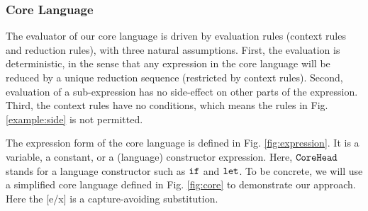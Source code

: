 \subsubsection{Core Language}


The evaluator of our core language is driven by evaluation rules (context rules and reduction rules), with three natural assumptions. First, the evaluation is deterministic, in the sense that any expression in the core language will be reduced by a unique reduction sequence (restricted by context rules). Second, evaluation of a sub-expression has no side-effect on other parts of the expression. Third, the context rules have no conditions, which means the rules in Fig. \ref{example:side} is not permitted.



The expression form of the core language is defined in Fig. \ref{fig:expression}. It is a variable, a constant, or a (language) constructor expression. Here, $\mbox{\tt CoreHead}$ stands for a language constructor such as $\mbox{\tt if}$ and $\mbox{\tt let}$. To be concrete, we will use a simplified core language defined in Fig.  \ref{fig:core} to demonstrate our approach. Here the [e/x] is a capture-avoiding substitution.

